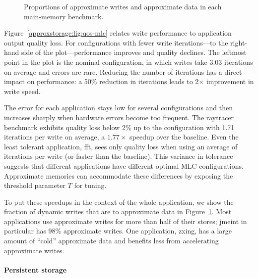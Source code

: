 \begin{figure}
    \centering
    
    \caption{
        Proportions of approximate writes and approximate data in
        each main-memory benchmark.
    }
    \label{approxstorage:fig:approxstats}
\end{figure}

Figure~\ref{approxstorage:fig:qos-mlc} relates write performance to application output
quality loss.
For configurations with fewer write iterations---to the
right-hand side of the plot---performance improves and quality declines. The
leftmost point in the plot is the nominal configuration, in which writes take
3.03 iterations on average and errors are rare. Reducing the number
of iterations has a direct impact on performance: a 50\% reduction in
iterations leads to 2$\times$ improvement in write speed.

The error for each application stays low for several configurations and then
increases sharply when hardware errors become too frequent.
The \textsf{raytracer} benchmark exhibits quality loss below 2\% up to the
configuration with 1.71 iterations per write on average, a $1.77\times$ speedup over the
baseline. Even the least tolerant application, \textsf{fft}, sees only
quality loss when using an average of  iterations per write (or
 faster than the baseline).
This variance in tolerance suggests that
different applications have different optimal MLC configurations. Approximate
memories can accommodate these differences by exposing the threshold parameter $T$
for tuning.

To put these speedups in the context of the whole application, we
show the fraction of
dynamic writes that are to approximate data in
Figure~\ref{approxstorage:fig:approxstats}.
Most applications use approximate writes for
more than half of their stores; \textsf{jmeint} in particular has 98\%
approximate writes. One application, \textsf{zxing}, has a large amount of
``cold'' approximate data and benefits less from accelerating
approximate writes.


\paragraph{Persistent storage}

